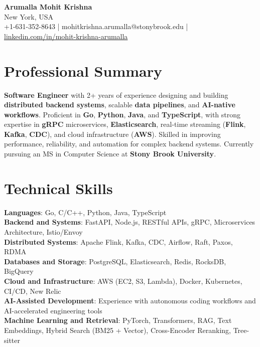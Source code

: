 \documentclass[letterpaper,11pt]{article}
\begin{document}
\begin{center}
  {\Large \textbf{Arumalla Mohit Krishna}} \\
  New York, USA \\
  +1-631-352-8643 \enspace | \enspace mohitkrishna.arumalla@stonybrook.edu \enspace | \enspace \href{https://www.linkedin.com/in/mohit-krishna-arumalla}{linkedin.com/in/mohit-krishna-arumalla}
\end{center}

\section{Professional Summary}
  \begin{itemize}[leftmargin=0.15in, label={}]
    \small{\item{
     \textbf{Software Engineer} with 2+ years of experience designing and building \textbf{distributed backend systems}, scalable \textbf{data pipelines}, and \textbf{AI-native workflows}. Proficient in \textbf{Go}, \textbf{Python}, \textbf{Java}, and \textbf{TypeScript}, with strong expertise in \textbf{gRPC} microservices, \textbf{Elasticsearch}, real-time streaming (\textbf{Flink}, \textbf{Kafka}, \textbf{CDC}), and cloud infrastructure (\textbf{AWS}). Skilled in improving performance, reliability, and automation for complex backend systems. Currently pursuing an MS in Computer Science at \textbf{Stony Brook University}.
    }}
  \end{itemize}
\vspace{-16pt}

\section{Technical Skills}
 \begin{itemize}[leftmargin=0.15in, label={}]
    \small{\item{
     \textbf{Languages}: Go, C/C++, Python, Java, TypeScript \\
     \textbf{Backend and Systems}: FastAPI, Node.js, RESTful APIs, gRPC, Microservices Architecture, Istio/Envoy \\
     \textbf{Distributed Systems}: Apache Flink, Kafka, CDC, Airflow, Raft, Paxos, RDMA \\
     \textbf{Databases and Storage}: PostgreSQL, Elasticsearch, Redis, RocksDB, BigQuery \\
     \textbf{Cloud and Infrastructure}: AWS (EC2, S3, Lambda), Docker, Kubernetes, CI/CD, New Relic \\
     \textbf{AI-Assisted Development}: Experience with autonomous coding workflows and AI-accelerated engineering tools \\
     \textbf{Machine Learning and Retrieval}: PyTorch, Transformers, RAG, Text Embeddings, Hybrid Search (BM25 + Vector), Cross-Encoder Reranking, Tree-sitter
    }}
 \end{itemize}
\vspace{-16pt}
\end{document}
